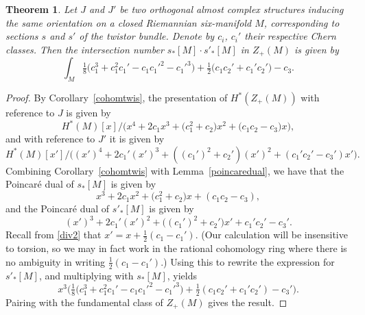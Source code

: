 \documentclass[10pt,a4paper]{amsart}
\numberwithin{equation}{section}
\newtheorem{Theorem}{Theorem}[section]
\begin{document}
\begin{Theorem}\label{intersection} Let $J$ and $J'$ be two orthogonal almost complex structures inducing the same orientation on a closed Riemannian six-manifold $M$, corresponding to sections $s$ and $s'$ of the twistor bundle. Denote by $c_i$, $c_i'$ their respective Chern classes. Then the intersection number $s_*[M] \cdot s'_*[M]$ in $Z_+(M)$ is given by \[\int_M \tfrac{1}{8}\big( c_1^3 + c_1^2 c_1' - c_1c_1'^2 - c_1'^3 \big) + \tfrac{1}{2} \big( c_1 c_2' + c_1' c_2' \big) - c_3.\]
\end{Theorem}

\begin{proof}
By Corollary~\ref{cohomtwis}, the presentation of $H^*(Z_+(M))$ with reference to $J$ is given by \[H^*(M)[x]/\big(x^4 + 2c_1x^3 + \big(c_1^2+c_2\big)x^2 + \big(c_1c_2-c_3\big)x\big),\] and with reference to $J'$ it is given by \[H^*(M)[x']/\big((x')^4 + 2c_1'(x')^3 + ((c_1')^2 + c_2')(x')^2 + (c_1'c_2'-c_3')x'\big).\] Combining Corollary~\ref{cohomtwis} with Lemma~\ref{poincaredual}, we have that the Poincar\'e dual of $s_*[M]$ is given by \[x^3 + 2c_1x^2 + \big(c_1^2+c_2\big)x + (c_1c_2-c_3),\] and the Poincar\'e dual of $s'_*[M]$ is given by \[(x')^3 + 2c_1'(x')^2 + \big((c_1')^2 + c_2'\big)x' + c_1'c_2'-c_3'.\] Recall from \eqref{div2} that $x' = x + \tfrac{1}{2}(c_1 - c_1')$. (Our calculation will be insensitive to torsion, so we may in fact work in the rational cohomology ring where there is no ambiguity in writing $\tfrac{1}{2}(c_1 - c_1')$.) Using this to rewrite the expression for $s'_*[M]$, and multiplying with $s_*[M]$, yields \[x^3\big( \tfrac{1}{8}\big( c_1^3 + c_1^2 c_1' - c_1c_1'^2 - c_1'^3 \big) + \tfrac{1}{2} ( c_1 c_2' + c_1' c_2' ) - c_3' \big).\] Pairing with the fundamental class of $Z_+(M)$ gives the result. \end{proof}
\end{document}
